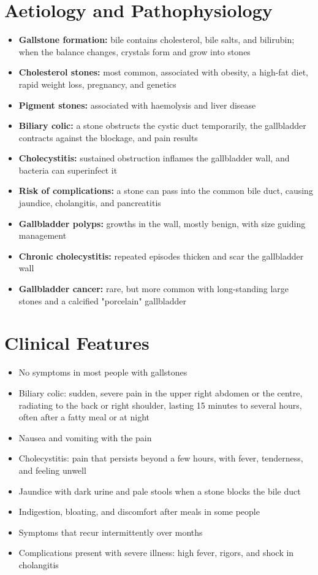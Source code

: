 \section*{Aetiology and Pathophysiology}
\begin{itemize}
    \item \textbf{Gallstone formation:} bile contains cholesterol, bile salts, and bilirubin; when the balance changes, crystals form and grow into stones
    \item \textbf{Cholesterol stones:} most common, associated with obesity, a high-fat diet, rapid weight loss, pregnancy, and genetics
    \item \textbf{Pigment stones:} associated with haemolysis and liver disease
    \item \textbf{Biliary colic:} a stone obstructs the cystic duct temporarily, the gallbladder contracts against the blockage, and pain results
    \item \textbf{Cholecystitis:} sustained obstruction inflames the gallbladder wall, and bacteria can superinfect it
    \item \textbf{Risk of complications:} a stone can pass into the common bile duct, causing jaundice, cholangitis, and pancreatitis
    \item \textbf{Gallbladder polyps:} growths in the wall, mostly benign, with size guiding management
    \item \textbf{Chronic cholecystitis:} repeated episodes thicken and scar the gallbladder wall
    \item \textbf{Gallbladder cancer:} rare, but more common with long-standing large stones and a calcified "porcelain" gallbladder
\end{itemize}

\section*{Clinical Features}
\begin{itemize}
    \item No symptoms in most people with gallstones
    \item Biliary colic: sudden, severe pain in the upper right abdomen or the centre, radiating to the back or right shoulder, lasting 15 minutes to several hours, often after a fatty meal or at night
    \item Nausea and vomiting with the pain
    \item Cholecystitis: pain that persists beyond a few hours, with fever, tenderness, and feeling unwell
    \item Jaundice with dark urine and pale stools when a stone blocks the bile duct
    \item Indigestion, bloating, and discomfort after meals in some people
    \item Symptoms that recur intermittently over months
    \item Complications present with severe illness: high fever, rigors, and shock in cholangitis
\end{itemize}

